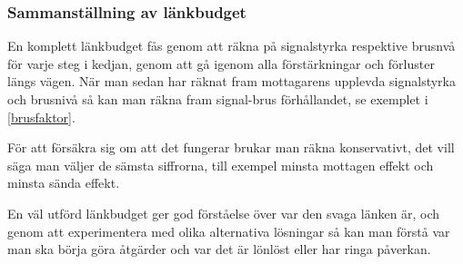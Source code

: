\subsubsection{Sammanställning av länkbudget}

En komplett länkbudget fås genom att räkna på signalstyrka respektive brusnvå
för varje steg i kedjan, genom att gå igenom alla förstärkningar och förluster
längs vägen.
När man sedan har räknat fram mottagarens upplevda signalstyrka och brusnivå så
kan man räkna fram signal-brus förhållandet, se exemplet i \ref{brusfaktor}.

För att försäkra sig om att det fungerar brukar man räkna konservativt, det
vill säga man väljer de sämsta siffrorna, till exempel minsta mottagen effekt
och minsta sända effekt.

En väl utförd länkbudget ger god förståelse över var den svaga länken är,
och genom att experimentera med olika alternativa lösningar så kan man
förstå var man ska börja göra åtgärder och var det är lönlöst eller har
ringa påverkan.
